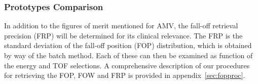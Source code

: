 \documentclass[a4paper,english,12pt]{article}
\begin{document}





\subsubsection{Prototypes Comparison}

In addition to the figures of merit mentioned for AMV, the fall-off retrieval precision (FRP) will be determined for its clinical relevance. The FRP is the standard deviation of the fall-off position (FOP) distribution, which is obtained by way of the batch method. Each of these can then be examined as function of the energy and TOF selections. A comprehensive description of our procedures for retrieving the FOP, FOW and FRP is provided in appendix~\ref{sec:fopproc}.

\end{document}
